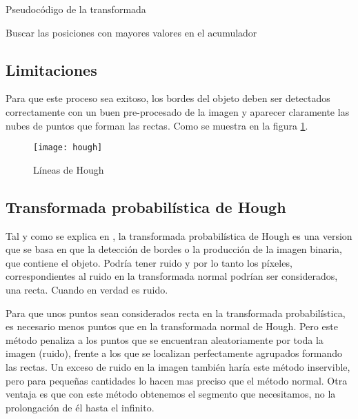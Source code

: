 \label{alg:Hough}
\begin{algorithm*}
\caption{Pseudocódigo de la transformada}
\DontPrintSemicolon
{}


Buscar las posiciones con mayores valores en el acumulador\;	

\end{algorithm*}

\subsection{Limitaciones}
Para que este proceso sea exitoso, los bordes del objeto deben ser detectados correctamente con un buen pre-procesado de la imagen y aparecer claramente las nubes de puntos que forman las rectas.
Como se muestra en la figura \ref{fig:3.5}.

\begin{figure}[h]
\centering
\texttt{[image: hough]}
\caption{Líneas de Hough~\cite{opencv:HoughIm}}
\label{fig:3.5}
\end{figure}
\subsection{Transformada probabilística de Hough}

Tal y como se explica en \cite{Kiryati20001157}, la transformada probabilística de Hough es una version que se basa en que la detección de bordes o la producción de la imagen binaria, que contiene el objeto. Podría tener ruido y por lo tanto los píxeles, correspondientes al ruido en la transformada normal podrían ser considerados, una recta. Cuando en verdad es ruido.

Para que unos puntos sean considerados recta en la transformada probabilística, es necesario menos puntos que en la transformada normal de Hough.
Pero este método penaliza a los puntos que se encuentran aleatoriamente por toda la imagen (ruido), frente a los que se localizan perfectamente agrupados formando las rectas. 
Un exceso de ruido en la imagen también haría este método inservible, pero para pequeñas cantidades lo hacen mas preciso que el método normal.
Otra ventaja es que con este método obtenemos el segmento que necesitamos, no la prolongación de él hasta el infinito.


